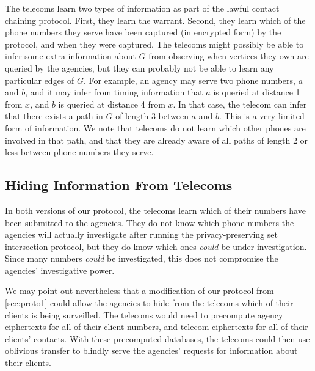 The telecoms learn two types of information as part of the lawful contact chaining protocol. First, they learn the warrant. Second, they learn which of the phone numbers they serve have been captured (in encrypted form) by the protocol, and when they were captured. The telecoms might possibly be able to infer some extra information about $G$ from observing when vertices they own are queried by the agencies, but they can probably not be able to learn any particular edges of $G$. For example, an agency may serve two phone numbers, $a$ and $b$, and it may infer from timing information that $a$ is queried at distance 1 from $x$, and $b$ is queried at distance 4 from $x$. In that case, the telecom can infer that there exists a path in $G$ of length 3 between $a$ and $b$. This is a very limited form of information. We note that telecoms do not learn which other phones are involved in that path, and that they are already aware of all paths of length 2 or less between phone numbers they serve.

\subsection{Hiding Information From Telecoms}
\label{sec:oblivious}

In both versions of our protocol, the telecoms learn which of their numbers have been submitted to the agencies. They do not know which phone numbers the agencies will actually investigate after running the privacy-preserving set intersection protocol, but they do know which ones \emph{could} be under investigation. Since many numbers \emph{could} be investigated, this does not compromise the agencies' investigative power.

We may point out nevertheless that a modification of our protocol from \ref{sec:proto1} could allow the agencies to hide from the telecoms which of their clients is being surveilled. The telecoms would need to precompute agency ciphertexts for all of their client numbers, and telecom ciphertexts for all of their clients' contacts. With these precomputed databases, the telecoms could then use oblivious transfer to blindly serve the agencies' requests for information about their clients.